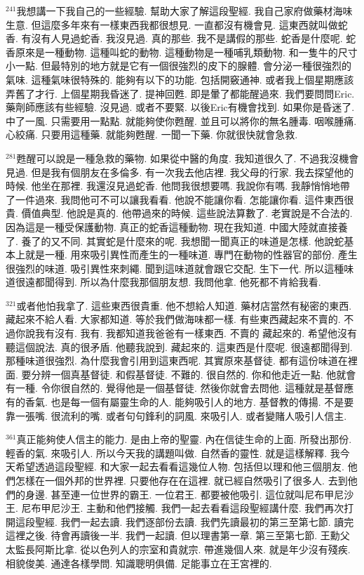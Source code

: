 \documentclass{book}
\begin{document}
$^{241}$我想講一下我自己的一些經驗.
幫助大家了解這段聖經.
我自己家府做藥材海味生意.
但這麼多年來有一樣東西我都很想見.
一直都沒有機會見.
這東西就叫做蛇香.
有沒有人見過蛇香.
我沒見過.
真的那些.
我不是講假的那些.
蛇香是什麼呢.
蛇香原來是一種動物.
這種叫蛇的動物.
這種動物是一種哺乳類動物.
和一隻牛的尺寸小一點.
但最特別的地方就是它有一個很強烈的皮下的腺體.
會分泌一種很強烈的氣味.
這種氣味很特殊的.
能夠有以下的功能.
包括開竅通神.
或者我上個星期應該弄舊了才行.
上個星期我昏迷了.
提神回甦.
即是暈了都能醒過來.
我們要問問Eric.
藥劑師應該有些經驗.
沒見過.
或者不要緊.
以後Eric有機會找到.
如果你是昏迷了.
中了一風.
只需要用一點點.
就能夠使你甦醒.
並且可以將你的無名腫毒.
咽喉腫痛.
心絞痛.
只要用這種藥.
就能夠甦醒.
一聞一下藥.
你就很快就會急救.

$^{281}$甦醒可以說是一種急救的藥物.
如果從中醫的角度.
我知道很久了.
不過我沒機會見過.
但是我有個朋友在多倫多.
有一次我去他店裡.
我父母的行家.
我去探望他的時候.
他坐在那裡.
我還沒見過蛇香.
他問我很想要嗎.
我說你有嗎.
我靜悄悄地帶了一件過來.
我問他可不可以讓我看看.
他說不能讓你看.
怎能讓你看.
這件東西很貴.
價值典型.
他說是真的.
他帶過來的時候.
這些說法算數了.
老實說是不合法的.
因為這是一種受保護動物.
真正的蛇香這種動物.
現在我知道.
中國大陸就直接養了.
養了的又不同.
其實蛇是什麼來的呢.
我想聞一聞真正的味道是怎樣.
他說蛇基本上就是一種.
用來吸引異性而產生的一種味道.
專門在動物的性器官的部份.
產生很強烈的味道.
吸引異性來刺繩.
聞到這味道就會跟它交配.
生下一代.
所以這種味道很遠都聞得到.
所以為什麼我那個朋友想.
我問他拿.
他死都不肯給我看.

$^{321}$或者他怕我拿了.
這些東西很貴重.
他不想給人知道.
藥材店當然有秘密的東西.
藏起來不給人看.
大家都知道.
等於我們做海味都一樣.
有些東西藏起來不賣的.
不過你說我有沒有.
我有.
我都知道我爸爸有一樣東西.
不賣的 藏起來的.
希望他沒有聽這個說法.
真的很矛盾.
他聽我說到.
藏起來的.
這東西是什麼呢.
很遠都聞得到.
那種味道很強烈.
為什麼我會引用到這東西呢.
其實原來基督徒.
都有這份味道在裡面.
要分辨一個真基督徒.
和假基督徒.
不難的.
很自然的.
你和他走近一點.
他就會有一種.
令你很自然的.
覺得他是一個基督徒.
然後你就會去問他.
這種就是基督應有的香氣.
也是每一個有屬靈生命的人.
能夠吸引人的地方.
基督教的傳揚.
不是要靠一張嘴.
很流利的嘴.
或者句句鋒利的詞風.
來吸引人.
或者變賭人吸引人信主.

$^{361}$真正能夠使人信主的能力.
是由上帝的聖靈.
內在信徒生命的上面.
所發出那份.
輕香的氣.
來吸引人.
所以今天我的講題叫做.
自然香的靈性.
就是這樣解釋.
我今天希望透過這段聖經.
和大家一起去看看這幾位人物.
包括但以理和他三個朋友.
他們怎樣在一個外邦的世界裡.
只要他存在在這裡.
就已經自然吸引了很多人.
去到他們的身邊.
甚至連一位世界的霸王.
一位君王.
都要被他吸引.
這位就叫尼布甲尼沙王.
尼布甲尼沙王.
主動和他們接觸.
我們一起去看看這段聖經講什麼.
我們再次打開這段聖經.
我們一起去讀.
我們逐部份去讀.
我們先讀最初的第三至第七節.
讀完這裡之後.
待會再讀後一半.
我們一起讀.
但以理書第一章.
第三至第七節.
王勳父太監長阿斯比拿.
從以色列人的宗室和貴就宗.
帶進幾個人來.
就是年少沒有殘疾.
相貌俊美.
通達各樣學問.
知識聰明俱備.
足能事立在王宮裡的.
\end{document}
